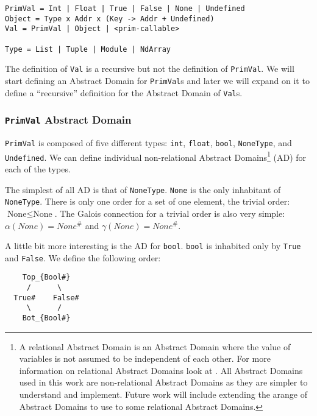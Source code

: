 \begin{verbatim}
PrimVal = Int | Float | True | False | None | Undefined
Object = Type x Addr x (Key -> Addr + Undefined)
Val = PrimVal | Object | <prim-callable>

Type = List | Tuple | Module | NdArray
\end{verbatim}

The definition of \texttt{Val} is a recursive but not the definition of
\texttt{PrimVal}. We will start defining an Abstract Domain for
\texttt{PrimVal}s and later we will expand on it to define a
\enquote{recursive} definition for the Abstract Domain of \texttt{Val}s.

\subsubsection{\texorpdfstring{\texttt{PrimVal} Abstract
Domain}{PrimVal Abstract Domain}}\label{primval-abstract-domain}

\texttt{PrimVal} is composed of five different types: \texttt{int},
\texttt{float}, \texttt{bool}, \texttt{NoneType}, and
\texttt{Undefined}. We can define individual non-relational Abstract
Domains\footnote{A relational Abstract Domain is an Abstract Domain
  where the value of variables is not assumed to be independent of each
  other. For more information on relational Abstract Domains look at
  {}. All Abstract Domains used
  in this work are non-relational Abstract Domains as they are simpler
  to understand and implement. Future work will include extending the
  arange of Abstract Domains to use to some relational Abstract Domains.}
(AD) for each of the types.

The simplest of all AD is that of \texttt{NoneType}. \texttt{None} is
the only inhabitant of \texttt{NoneType}. There is only one order for a
set of one element, the trivial order: \(\text{None} \le \text{None}\).
The Galois connection for a trivial order is also very simple:
\(\alpha(None) = None^{\#}\) and \(\gamma(None) = None^{\#}\).

A little bit more interesting is the AD for \texttt{bool}. \texttt{bool}
is inhabited only by \texttt{True} and \texttt{False}. We define the
following order:

{}

\begin{verbatim}
    Top_{Bool#}
     /      \
  True#    False#
     \      /
    Bot_{Bool#}
\end{verbatim}

